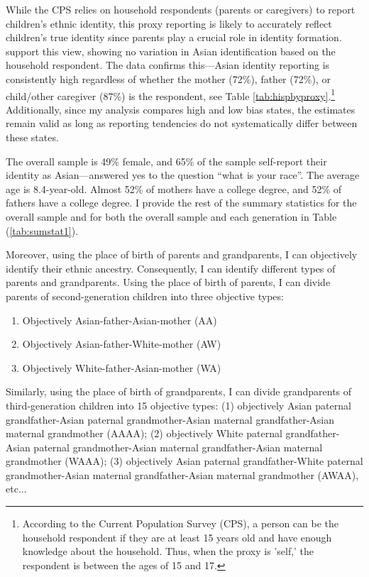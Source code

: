While the CPS relies on household respondents (parents or caregivers) to report children's ethnic identity, this proxy reporting is likely to accurately reflect children's true identity since parents play a crucial role in identity formation. \textcite{duncanIntermarriageIntergenerationalTransmission2011} support this view, showing no variation in Asian identification based on the household respondent. The data confirms this---Asian identity reporting is consistently high regardless of whether the mother (72\%), father (72\%), or child/other caregiver (87\%) is the respondent, see Table \ref{tab:hispbyproxy}.\footnote{According to the Current Population Survey (CPS), a person can be the household respondent if they are at least 15 years old and have enough knowledge about the household. Thus, when the proxy is 'self,' the respondent is between the ages of 15 and 17.} Additionally, since my analysis compares high and low bias states, the estimates remain valid as long as reporting tendencies do not systematically differ between these states.

The overall sample is 49\% female, and 65\% of the sample self-report their identity as Asian---answered yes to the question ``what is your race''. The average age is 8.4-year-old. Almost 52\% of mothers have a college degree, and 52\% of fathers have a college degree. I provide the rest of the summary statistics for the overall sample and for both the overall sample and each generation in Table (\ref{tab:sumstat1}). 

Moreover, using the place of birth of parents and grandparents, I can objectively identify their ethnic ancestry. Consequently, I can identify different types of parents and grandparents. Using the place of birth of parents, I can divide parents of second-generation children into three objective types: 
\begin{enumerate}
\item Objectively Asian-father-Asian-mother (AA)
\item Objectively Asian-father-White-mother (AW)
\item Objectively White-father-Asian-mother (WA)
\end{enumerate}

Similarly, using the place of birth of grandparents, I can divide grandparents of third-generation children into 15 objective types: (1) objectively Asian paternal grandfather-Asian paternal grandmother-Asian maternal grandfather-Asian maternal grandmother (AAAA); (2) objectively White paternal grandfather-Asian paternal grandmother-Asian maternal grandfather-Asian maternal grandmother (WAAA); (3) objectively Asian paternal grandfather-White paternal grandmother-Asian maternal grandfather-Asian maternal grandmother (AWAA), etc...

